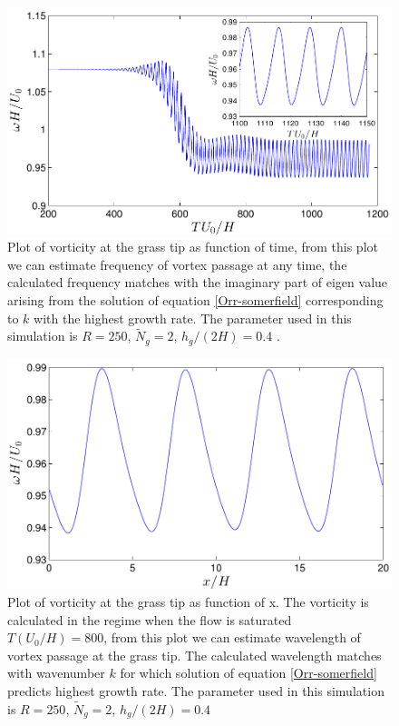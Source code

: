 \documentclass[12pt]{report}   %
\newcommand{\Ndg}{\tilde{N}_g}
\begin{document}
\begin{figure}
\centerline{\includegraphics[scale=0.95]{LinearStabilityVsCFD_TimeVsVorticity}}
\caption[Plot of vorticity at the grass tip as function of time. ]{Plot of vorticity at the grass tip as function of time, from this plot we can estimate frequency of vortex passage at any time, the calculated frequency matches with the imaginary part of eigen value arising from the solution of equation \eqref{Orr-somerfield} corresponding to $k$ with the highest growth rate. The parameter used in this simulation is $R=250$, $\Ndg=2$, $h_g/(2H)=0.4$ .}
\label{TimeVsVorticity}
\end{figure}

\begin{figure}
\centerline{\includegraphics[scale=0.95]{LinearStabilityVsCFD_XVsVorticity}}
\caption [Plot of vorticity at the grass tip as function of x. ] {Plot of vorticity at the grass tip as function of x. The vorticity is calculated in the regime when the flow is saturated $T(U_0/H)=800$, from this plot we can estimate wavelength of vortex passage at the grass tip. The calculated wavelength  matches with wavenumber $k$ for which solution of equation \eqref{Orr-somerfield} predicts highest growth rate. The parameter used in this simulation is $R=250$, $\Ndg=2$, $h_g/(2H)=0.4$}
\label{XVsVorticity}
\end{figure}
\end{document}
